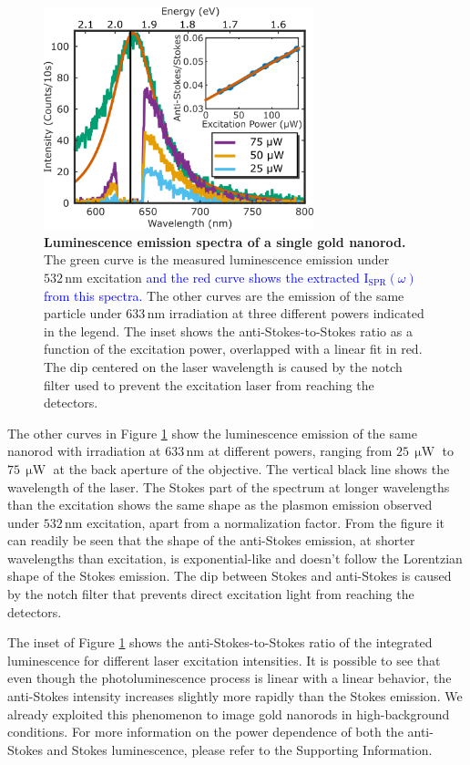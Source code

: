 \documentclass[journal=nalefd,manuscript=letter]{achemso}
\newcommand{\HI}[1]{\textcolor{blue}{#1}} %
\newcommand{\nm}{\ensuremath{\,\textrm{nm}}}
\newcommand{\uW}{\ensuremath{\,\upmu\textrm{W}}}
\begin{document}
\begin{figure}[tp] \centering
\includegraphics[width=78.4mm]{Figures/02_Several_Intensities/02_several_intensities.png}
\caption{\textbf{Luminescence emission spectra of a single gold nanorod.} The green curve is the
measured luminescence emission under $532\nm$ excitation \HI{and the red curve shows the 
extracted $\textrm{I}_{\textrm{SPR}}(\omega)$ from this spectra.}
The other curves are the emission of the same particle under $633\nm$ irradiation at three 
different powers indicated in the legend. The inset shows the anti-Stokes-to-Stokes ratio as a function
of the excitation power, overlapped with a linear fit in red. The dip centered on the laser wavelength
is caused by the notch filter used to prevent the excitation laser from reaching the detectors.}
	\label{fig:spectra_intensity}
\end{figure}

The other curves in Figure \ref{fig:spectra_intensity} show the luminescence emission of
the same nanorod with irradiation at $633\nm$ at different powers,
ranging from $25\uW$ to $75\uW$ at the back aperture of the objective.  
The vertical black line shows the wavelength of the laser. The Stokes part of the
spectrum at longer wavelengths than the excitation shows the same shape as the
plasmon emission observed under $532\nm$ excitation, apart from a normalization
factor. From the figure it can readily be seen that the shape of the anti-Stokes
emission, at shorter wavelengths than excitation, is exponential-like and
doesn't follow the Lorentzian shape of the Stokes emission. The dip between
Stokes and anti-Stokes is caused by the notch filter that prevents direct
excitation light from reaching the detectors. 

The inset of Figure \ref{fig:spectra_intensity} shows the anti-Stokes-to-Stokes ratio of
the integrated luminescence for different laser excitation intensities. It is
possible to see that even though the photoluminescence process is linear with a 
linear behavior, the anti-Stokes intensity increases slightly more rapidly than the Stokes emission.
We already exploited this phenomenon to image gold nanorods in high-background
conditions\cite{Carattino2016a}. 
For more information on the power dependence of both the anti-Stokes and Stokes luminescence, 
please refer to the Supporting Information. 
\end{document}
